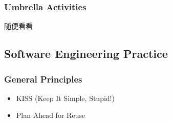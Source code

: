 \subsubsection{Umbrella Activities}
随便看看

\subsection{Software Engineering Practice}
\subsubsection{General Principles}
\begin{itemize}
    \item KISS (Keep It Simple, Stupid!)
    \item Plan Ahead for Reuse
\end{itemize}

